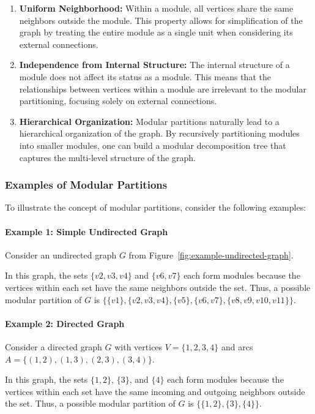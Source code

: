 \begin{enumerate}
    \item \textbf{Uniform Neighborhood:} Within a module, all vertices share the same neighbors outside the module.
    This property allows for simplification of the graph by treating the entire module as a single unit when considering its external connections.
    \item \textbf{Independence from Internal Structure:} The internal structure of a module does not affect its status as a module.
    This means that the relationships between vertices within a module are irrelevant to the modular partitioning, focusing solely on external connections.
    \item \textbf{Hierarchical Organization:} Modular partitions naturally lead to a hierarchical organization of the graph.
    By recursively partitioning modules into smaller modules, one can build a modular decomposition tree that captures the multi-level structure of the graph.
\end{enumerate}

\subsubsection*{Examples of Modular Partitions}

To illustrate the concept of modular partitions, consider the following examples:

\paragraph*{Example 1: Simple Undirected Graph}

Consider an undirected graph $G$ from Figure~\ref{fig:example-undirected-graph}.

In this graph, the sets $\{v2, v3, v4\}$ and $\{v6, v7\}$ each form modules because the vertices within each set have the same neighbors outside the set.
Thus, a possible modular partition of $G$ is $\{\{v1\}, \{v2, v3, v4\}, \{v5\}, \{v6, v7\}, \{v8, v9, v10, v11\}\}$.

\paragraph*{Example 2: Directed Graph}

Consider a directed graph $G$ with vertices $V = \{1, 2, 3, 4\}$ and arcs $A = \{(1, 2), (1, 3), (2, 3), (3, 4)\}$.

In this graph, the sets $\{1, 2\}$, $\{3\}$, and $\{4\}$ each form modules because the vertices within each set have the same incoming and outgoing neighbors outside the set.
Thus, a possible modular partition of $G$ is $\{\{1, 2\}, \{3\}, \{4\}\}$.

